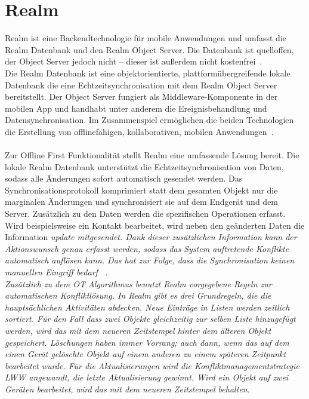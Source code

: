 \section{\label{sub:realm}Realm}
Realm ist eine Backendtechnologie für mobile Anwendungen und umfasst die Realm Datenbank und den Realm Object Server.
Die Datenbank ist quelloffen, der Object Server jedoch nicht -- dieser ist außerdem nicht kostenfrei~\cite{realm}.\\
Die Realm Datenbank ist eine objektorientierte, plattformübergreifende lokale Datenbank die eine Echtzeitsynchronisation mit dem Realm Object Server bereitstellt.
Der Object Server fungiert als \gls{Middleware}-Komponente in der mobilen \gls{App} und handhabt unter anderem die Ereignisbehandlung und Datensynchronisation.
Im Zusammenspiel ermöglichen die beiden Technologien die Erstellung von offlinefähigen, kollaborativen, mobilen Anwendungen~\cite{realm_whitepaper}.\\\\
%
%
Zur Offline First Funktionalität stellt Realm eine umfassende Lösung bereit.
Die lokale Realm Datenbank unterstützt die Echtzeitsynchronisation von Daten, sodass alle Änderungen sofort automatisch gesendet werden.
Das Synchronisationsprotokoll komprimiert statt dem gesamten Objekt nur die marginalen Änderungen und synchronisiert sie auf dem Endgerät und dem Server.
Zusätzlich zu den Daten werden die spezifischen Operationen erfasst. 
Wird beispielsweise ein Kontakt bearbeitet, wird neben den geänderten Daten die Information \it{update} mitgesendet.
Dank dieser zusätzlichen Information kann der Aktionswunsch genau erfasst werden, sodass das System auftretende Konflikte automatisch auflösen kann.
Das hat zur Folge, dass die Synchronisation keinen manuellen Eingriff bedarf ~\cite{realm_offline_whitepaper}.\\
%
Zusätzlich zu dem \gls{OT} Algorithmus benutzt Realm vorgegebene Regeln zur automatischen Konfliktlösung.
In Realm gibt es drei Grundregeln, die die hauptsächlichen Aktivitäten abdecken.
Neue Einträge in Listen werden zeitlich sortiert. Für den Fall dass zwei Objekte gleichzeitig zur selben Liste hinzugefügt werden, wird das mit dem neueren Zeitstempel hinter dem älteren Objekt gespeichert.
Löschungen haben immer Vorrang; auch dann, wenn das auf dem einen Gerät gelöschte Objekt auf einem anderen zu einem späteren Zeitpunkt bearbeitet wurde.
Für die Aktualisierungen wird die Konfliktmanagementstrategie \gls{LWW} angewandt, die letzte Aktualisierung gewinnt.
Wird ein Objekt auf zwei Geräten bearbeitet, wird das mit dem neueren Zeitstempel behalten.\\ 
